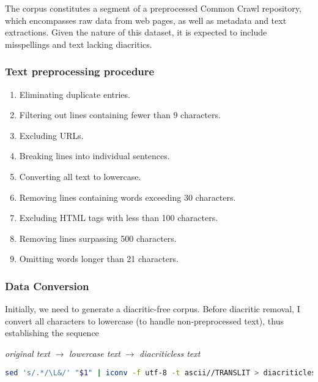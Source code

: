 \documentclass{article}
\begin{document}
The corpus constitutes a segment of a preprocessed Common Crawl repository, which encompasses raw data from web pages, as well as metadata and text extractions.
Given the nature of this dataset, it is expected to include misspellings and text lacking diacritics.


\subsubsection{Text preprocessing procedure}
\begin{enumerate}
  \item Eliminating duplicate entries.
  \item Filtering out lines containing fewer than 9 characters.
  \item Excluding URLs.
  \item Breaking lines into individual sentences.
  \item Converting all text to lowercase.
  \item Removing lines containing words exceeding 30 characters.
  \item Excluding HTML tags with less than 100 characters.
  \item Removing lines surpassing 500 characters.
  \item Omitting words longer than 21 characters.
\end{enumerate}

\hfill \break

\subsubsection{Data Conversion}
Initially, we need to generate a diacritic-free corpus.
Before diacritic removal, I convert all characters to lowercase (to handle non-preprocessed text), thus establishing the sequence

\centerline{ \textit{original text} $\rightarrow$ \textit{lowercase text} $\rightarrow$ \textit{diacriticless text} }

\newblock

\begin{lstlisting}[language=bash,basicstyle=\small\ttfamily, frame=single, caption={Script for removing diacritics using Unix utilities}, captionpos=b, label={lst:diacriticless.sh},backgroundcolor=\color{light-gray}] 
sed 's/.*/\L&/' "$1" | iconv -f utf-8 -t ascii//TRANSLIT > diacriticless/"$1" \end{lstlisting}

\newblock
\end{document}
